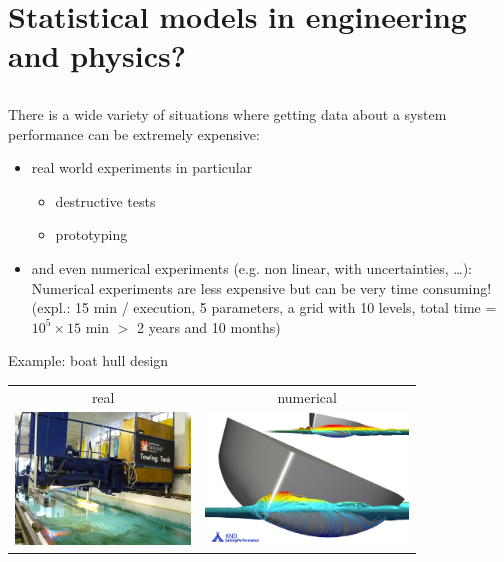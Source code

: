 \section[Statistical Models]{Statistical models in engineering and physics?}
\subsection{}
\begin{frame}{}
There is a wide variety of situations where getting data about a system performance can be extremely expensive:
\begin{itemize}
	\item real world experiments in particular
\begin{itemize}
	\item destructive tests
	\item prototyping
\end{itemize}
	\item and even numerical experiments (e.g. non linear, with uncertainties, \dots): 
Numerical experiments are less expensive but can be very time consuming! (expl.: 15 min / execution, 5 parameters, a grid with 10 levels,
total time = $10^5 \times 15$ min $>$ 2 years and 10 months)
\end{itemize}
\end{frame}

\begin{frame}{}
\begin{exampleblock}{Example: boat hull design}
\begin{center}
\begin{tabular}{cc}
real \vspace{1.cm} & numerical \\
\includegraphics[height=3.5cm]{1_stat_models/figures/carene2} &
\includegraphics[height=3.5cm]{1_stat_models/figures/waterflow}
\end{tabular}
\end{center}
\end{exampleblock}
\end{frame}

